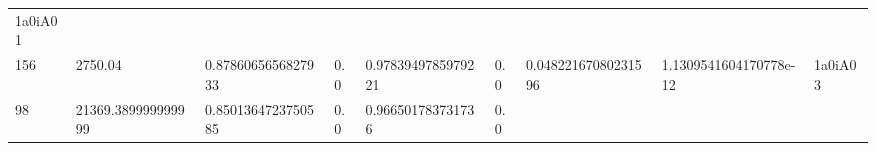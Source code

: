 \documentclass[11pt,a4paper,twoside]{book}
\theoremstyle{definition}
\theoremstyle{definition}
\theoremstyle{remark}
\begin{document}
\begin{longtable}[]{@{}lllllllll@{}}
\begin{minipage}[t]{0.04\columnwidth}
1a0iA01\strut
\end{minipage}\tabularnewline
\begin{minipage}[t]{0.04\columnwidth}\raggedright\strut
156\strut
\end{minipage} & \begin{minipage}[t]{0.04\columnwidth}\raggedright\strut
2750.04\strut
\end{minipage} & \begin{minipage}[t]{0.04\columnwidth}\raggedright\strut
0.8786065656827933\strut
\end{minipage} & \begin{minipage}[t]{0.04\columnwidth}\raggedright\strut
0.0\strut
\end{minipage} & \begin{minipage}[t]{0.04\columnwidth}\raggedright\strut
0.9783949785979221\strut
\end{minipage} & \begin{minipage}[t]{0.04\columnwidth}\raggedright\strut
0.0\strut
\end{minipage} & \begin{minipage}[t]{0.04\columnwidth}\raggedright\strut
0.04822167080231596\strut
\end{minipage} & \begin{minipage}[t]{0.04\columnwidth}\raggedright\strut
1.1309541604170778e-12\strut
\end{minipage} & \begin{minipage}[t]{0.04\columnwidth}\raggedright\strut
1a0iA03\strut
\end{minipage}\tabularnewline
\begin{minipage}[t]{0.04\columnwidth}\raggedright\strut
98\strut
\end{minipage} & \begin{minipage}[t]{0.04\columnwidth}\raggedright\strut
21369.389999999999\strut
\end{minipage} & \begin{minipage}[t]{0.04\columnwidth}\raggedright\strut
0.8501364723750585\strut
\end{minipage} & \begin{minipage}[t]{0.04\columnwidth}\raggedright\strut
0.0\strut
\end{minipage} & \begin{minipage}[t]{0.04\columnwidth}\raggedright\strut
0.966501783731736\strut
\end{minipage} & \begin{minipage}[t]{0.04\columnwidth}\raggedright\strut
0.0\strut

\end{minipage}
\end{longtable}
\end{document}
